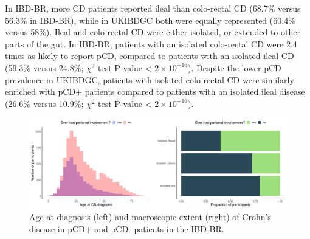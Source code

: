 In IBD-BR, more CD patients reported ileal than colo-rectal CD (68.7\% versus 56.3\% in IBD-BR), while in UKIBDGC both were equally represented (60.4\% versus 58\%). Ileal and colo-rectal CD were either isolated, or extended to other parts of the gut. In IBD-BR, patients with an isolated colo-rectal CD were 2.4 times as likely to report pCD, compared to patients with an isolated ileal CD (59.3\% versus 24.8\%; $\chi^{2}$ test P-value < $2\times10^{-16}$).  Despite the lower pCD prevalence in UKIBDGC, patients with isolated colo-rectal CD were similarly enriched with pCD+ patients compared to patients with an isolated ileal disease (26.6\% versus 10.9\%; $\chi^{2}$ test P-value < $2\times10^{-16}$).\\ %
\begin{figure}[htbp!] 
  \centering    
  \includegraphics[width=1.0\textwidth]{fig1}
  \caption[Age at diagnosis and macroscopic extent of Crohn's disease in pCD+ and pCD- patients in the IBD-BR.]{Age at diagnosis (left) and macroscopic extent (right) of Crohn's disease in pCD+ and pCD- patients in the IBD-BR.}
  \label{fig:age_diag_macextent}
  \end{figure}

